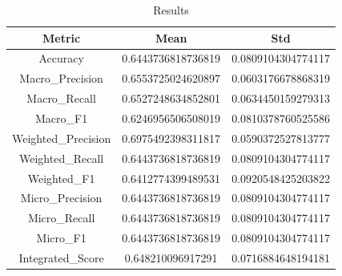\begin{table}[htbp]
\centering
\caption{Results}
\label{tab:csv}
\small
\setlength{\tabcolsep}{4pt}
\begin{tabular}{|c|c|c|}
\hline
Metric & Mean & Std \\
\hline
Accuracy & 0.6443736818736819 & 0.0809104304774117 \\
Macro_Precision & 0.6553725024620897 & 0.0603176678868319 \\
Macro_Recall & 0.6527248634852801 & 0.0634450159279313 \\
Macro_F1 & 0.6246956506508019 & 0.0810378760525586 \\
Weighted_Precision & 0.6975492398311817 & 0.0590372527813777 \\
Weighted_Recall & 0.6443736818736819 & 0.0809104304774117 \\
Weighted_F1 & 0.6412774399489531 & 0.0920548425203822 \\
Micro_Precision & 0.6443736818736819 & 0.0809104304774117 \\
Micro_Recall & 0.6443736818736819 & 0.0809104304774117 \\
Micro_F1 & 0.6443736818736819 & 0.0809104304774117 \\
Integrated_Score & 0.648210096917291 & 0.0716884648194181 \\
\hline
\end{tabular}
\end{table}